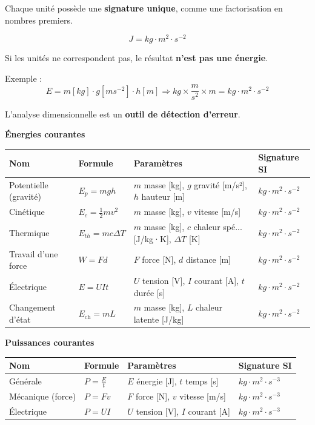 \documentclass[11pt,a4paper]{article}
\newcommand{\theorybox}[2]{
\begin{tcolorbox}[title=\textbf{#1}]
#2
\end{tcolorbox}
}
\begin{document}
\theorybox{I - Analyse dimensionnelle (signature des unités)}{
Chaque unité possède une \textbf{signature unique}, comme une factorisation en nombres premiers.

\[
J = kg \cdot m^2 \cdot s^{-2}
\]

Si les unités ne correspondent pas, le résultat \textbf{n’est pas une énergie}.  

Exemple :
\[
E = m[kg]\cdot g[ms^{-2}]\cdot h[m]
\Rightarrow
kg \times \frac{m}{s^2} \times m = kg \cdot m^2 \cdot s^{-2}
\]

L’analyse dimensionnelle est un \textbf{outil de détection d’erreur}.
}
\theorybox{J - Formules courantes d'énergie et de puissance}{
\vspace{0.2cm}

\textbf{Énergies courantes}

\begin{center}
\begin{tabular}{|>{\small}l|>{\small}l|>{\small}l|>{\small}l|}
\hline
\textbf{Nom} & \textbf{Formule} & \textbf{Paramètres} & \textbf{Signature SI} \\
\hline
Potentielle (gravité) & $E_p = m g h$ & $m$ masse [kg], $g$ gravité [m/s²], $h$ hauteur [m] & $kg \cdot m^2 \cdot s^{-2}$ \\
\hline
Cinétique & $E_c = \frac{1}{2} m v^2$ & $m$ masse [kg], $v$ vitesse [m/s] & $kg \cdot m^2 \cdot s^{-2}$ \\
\hline
Thermique & $E_{th} = m c \Delta T$ & $m$ masse [kg], $c$ chaleur spé... [J/kg·K], $\Delta T$ [K] & $kg \cdot m^2 \cdot s^{-2}$ \\
\hline
Travail d'une force & $W = F d$ & $F$ force [N], $d$ distance [m] & $kg \cdot m^2 \cdot s^{-2}$ \\
\hline
Électrique & $E = U I t$ & $U$ tension [V], $I$ courant [A], $t$ durée [s] & $kg \cdot m^2 \cdot s^{-2}$ \\
\hline
Changement d'état & $E_\text{ch} = m L$ & $m$ masse [kg], $L$ chaleur latente [J/kg] & $kg \cdot m^2 \cdot s^{-2}$ \\
\hline
\end{tabular}
\end{center}

\vspace{0.3cm}

\textbf{Puissances courantes}

\begin{center}
\begin{tabular}{|l|l|l|l|}
\hline
\textbf{Nom} & \textbf{Formule} & \textbf{Paramètres} & \textbf{Signature SI} \\
\hline
Générale & $P = \frac{E}{t}$ & $E$ énergie [J], $t$ temps [s] & $kg \cdot m^2 \cdot s^{-3}$ \\
\hline
Mécanique (force) & $P = F v$ & $F$ force [N], $v$ vitesse [m/s] & $kg \cdot m^2 \cdot s^{-3}$ \\
\hline
Électrique & $P = U I$ & $U$ tension [V], $I$ courant [A] & $kg \cdot m^2 \cdot s^{-3}$ \\
\hline
\end{tabular}
\end{center}

}
\end{document}
